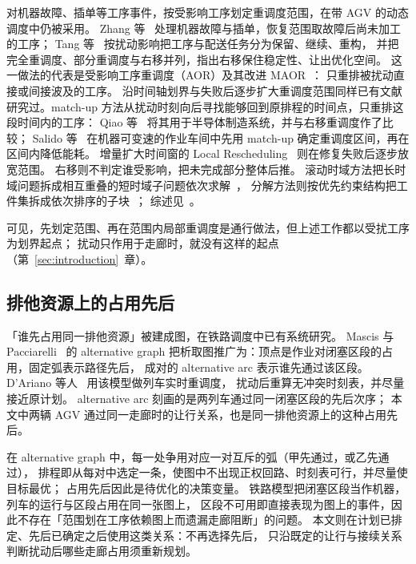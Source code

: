 \documentclass[manuscript,screen,review]{acmart}
\begin{document}
对机器故障、插单等工序事件，按受影响工序划定重调度范围，在带 AGV 的动态调度中仍被采用。
Zhang 等~\cite{zhang2023energy} 处理机器故障与插单，恢复范围取故障后尚未加工的工序；
Tang 等~\cite{tang2026dynamic} 按扰动影响把工序与配送任务分为保留、继续、重构，
并把完全重调度、部分重调度与右移并列，指出右移保住稳定性、让出优化空间。
这一做法的代表是受影响工序重调度（AOR）及其改进 MAOR~\cite{subramaniam2003maor}：
只重排被扰动直接或间接波及的工序。
沿时间轴划界与失败后逐步扩大重调度范围同样已有文献研究过。match-up 方法从扰动时刻向后寻找能够回到原排程的时间点，只重排这段时间内的工序：
Qiao 等~\cite{qiao2012single} 将其用于半导体制造系统，并与右移重调度作了比较；
Salido 等~\cite{salido2017rescheduling} 在机器可变速的作业车间中先用 match-up 确定重调度区间，再在区间内降低能耗。
增量扩大时间窗的 Local Rescheduling~\cite{kuster2007local} 则在修复失败后逐步放宽范围。
右移则不判定谁受影响，把未完成部分整体后推。
滚动时域方法把长时域问题拆成相互重叠的短时域子问题依次求解~\cite{li2025learning}，
分解方法则按优先约束结构把工件集拆成依次排序的子块~\cite{margot2003decompositions}；
综述见~\cite{vieira2003rescheduling,ouelhadj2009survey}。

可见，先划定范围、再在范围内局部重调度是通行做法，但上述工作都以受扰工序为划界起点；
扰动只作用于走廊时，就没有这样的起点（第~\ref{sec:introduction}~章）。

\subsection{排他资源上的占用先后}
\label{sec:rw_ag}

「谁先占用同一排他资源」被建成图，在铁路调度中已有系统研究。
Mascis 与 Pacciarelli~\cite{mascis2002alternative} 的 alternative graph
把析取图推广为：顶点是作业对闭塞区段的占用，固定弧表示路径先后，
成对的 alternative arc 表示谁先通过该区段。
D'Ariano 等人~\cite{dariano2007branch} 用该模型做列车实时重调度，
扰动后重算无冲突时刻表，并尽量接近原计划。
alternative arc 刻画的是两列车通过同一闭塞区段的先后次序；
本文中两辆 AGV 通过同一走廊时的让行关系，也是同一排他资源上的这种占用先后。

在 alternative graph 中，每一处争用对应一对互斥的弧（甲先通过，或乙先通过），
排程即从每对中选定一条，使图中不出现正权回路、时刻表可行，并尽量使目标最优；
占用先后因此是待优化的决策变量。
铁路模型把闭塞区段当作机器，列车的运行与区段占用在同一张图上，
区段不可用即直接表现为图上的事件，因此不存在「范围划在工序依赖图上而遗漏走廊阻断」的问题。
本文则在计划已排定、先后已确定之后使用这类关系：不再选择先后，
只沿既定的让行与接续关系判断扰动后哪些走廊占用须重新规划。
\end{document}
